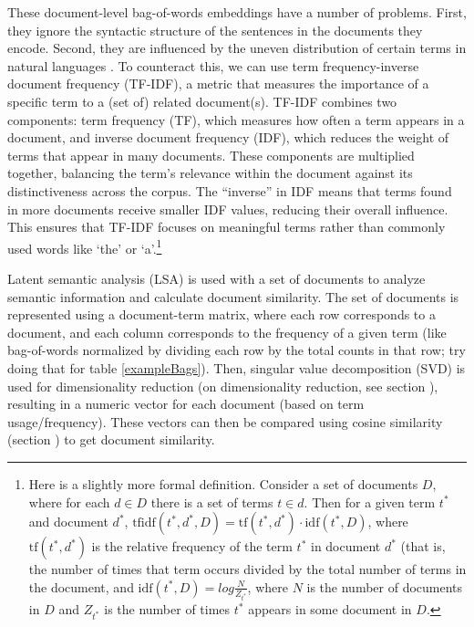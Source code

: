 These document-level bag-of-words embeddings have a number of problems. First, they ignore the syntactic structure of the sentences in the documents they encode. Second, they are influenced by the uneven distribution of certain terms in natural languages \cite{piantadosi2014zipf, zipf1945meaning}. To counteract this, we can use term frequency-inverse document frequency (TF-IDF), a metric that measures the importance of a specific term to a (set of) related document(s). TF-IDF combines two components: term frequency (TF), which measures how often a term appears in a document, and inverse document frequency (IDF), which reduces the weight of terms that appear in many documents. These components are multiplied together, balancing the term's relevance within the document against its distinctiveness across the corpus. The ``inverse'' in IDF means that terms found in more documents receive smaller IDF values, reducing their overall influence. This ensures that TF-IDF focuses on meaningful terms rather than commonly used words like `the' or `a'.\footnote{Here is a slightly more formal definition. Consider a set of documents $D$, where for each $d \in D$ there is a set of terms $t \in d$. Then for a given term $t^*$ and document $d^*$, $\mbox{tfidf}(t^*,d^*, D) = \mbox{tf}(t^*,d^*) \cdot \mbox{idf}(t^*, D)$, where $\mbox{tf}(t^*,d^*)$ is the relative frequency of the term $t^*$ in document $d^*$ (that is, the number of times that term occurs divided by the total number of terms in the document, and $\mbox{idf}(t^*, D) = log \frac{N}{Z_{t^*}}$, where $N$ is the number of documents in $D$ and $Z_{t^*}$ is the number of times $t^*$ appears in some document in $D$. }

Latent semantic analysis (LSA) is used with a set of documents to analyze semantic information and calculate document similarity. The set of documents is represented using a document-term matrix, where each row corresponds to a document, and each column corresponds to the frequency of a given term (like bag-of-words normalized by dividing each row by the total counts in that row; try doing that for table \ref{exampleBags}). Then, singular value decomposition (SVD) is used for dimensionality reduction (on dimensionality reduction, see section ), resulting in a numeric vector for each document (based on term usage/frequency). These vectors can then be compared using cosine similarity (section ) to get document similarity.

